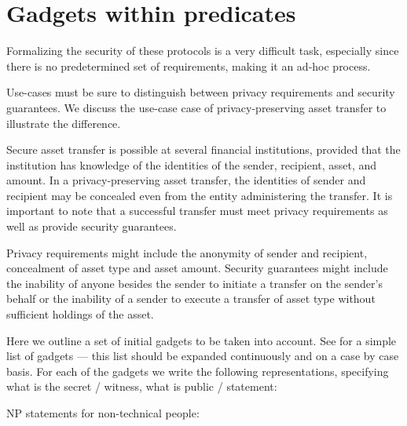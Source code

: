 \section{Gadgets within predicates}
\label{apps:gadgets-within-predicates}


	Formalizing the security of these protocols is a very difficult task, especially since there is no predetermined set of requirements, making it an ad-hoc process.
	
	Use-cases must be sure to distinguish between privacy requirements and security guarantees.
	We discuss the use-case case of privacy-preserving asset transfer to illustrate the difference.

	Secure asset transfer is possible at several financial institutions, provided that the institution has knowledge of the identities of the sender, recipient, asset, and amount.
	In a privacy-preserving asset transfer, the identities of sender and recipient may be concealed even from the entity administering the transfer.
	It is important to note that a successful transfer must meet privacy requirements as well as provide security guarantees.

	Privacy requirements might include the anonymity of sender and recipient, concealment of asset type and asset amount.
	Security guarantees might include the inability of anyone besides the sender to initiate a transfer on the sender's behalf or the inability of a sender to execute a transfer of asset type without sufficient holdings of the asset. 


	Here we outline a set of initial gadgets to be taken into account.%
See  for a simple list of gadgets --- this list should be expanded continuously and on a case by case basis.
	For each of the gadgets %
we write the following representations, specifying what is the secret / witness, what is public / statement:

NP statements for non-technical people:

